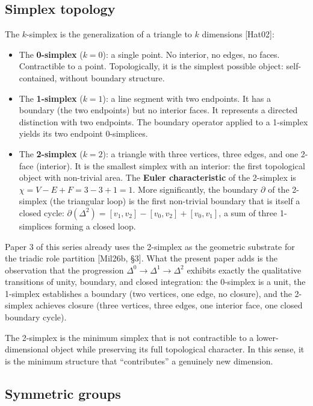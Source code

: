 \documentclass[12pt]{article}
\begin{document}
\subsection{Simplex topology}\label{simplex-topology}

The \(k\)-simplex is the generalization of a triangle to \(k\)
dimensions {[}Hat02{]}:

\begin{itemize}
\item
  The \textbf{0-simplex} (\(k=0\)): a single point. No interior, no
  edges, no faces. Contractible to a point. Topologically, it is the
  simplest possible object: self-contained, without boundary structure.
\item
  The \textbf{1-simplex} (\(k=1\)): a line segment with two endpoints.
  It has a boundary (the two endpoints) but no interior faces. It
  represents a directed distinction with two endpoints. The boundary
  operator applied to a 1-simplex yields its two endpoint 0-simplices.
\item
  The \textbf{2-simplex} (\(k=2\)): a triangle with three vertices,
  three edges, and one 2-face (interior). It is the smallest simplex
  with an interior: the first topological object with non-trivial area.
  The \textbf{Euler characteristic} of the 2-simplex is
  \(\chi = V - E + F = 3 - 3 + 1 = 1\). More significantly, the boundary
  \(\partial\) of the 2-simplex (the triangular loop) is the first
  non-trivial boundary that is itself a closed cycle:
  \(\partial(\Delta^2) = [v_1, v_2] - [v_0, v_2] + [v_0, v_1]\), a sum
  of three 1-simplices forming a closed loop.
\end{itemize}

Paper 3 of this series already uses the 2-simplex as the geometric
substrate for the triadic role partition {[}Mil26b, §3{]}. What the
present paper adds is the observation that the progression
\(\Delta^0 \to \Delta^1 \to \Delta^2\) exhibits exactly the qualitative
transitions of unity, boundary, and closed integration: the 0-simplex is
a unit, the 1-simplex establishes a boundary (two vertices, one edge, no
closure), and the 2-simplex achieves closure (three vertices, three
edges, one interior face, one closed boundary cycle).

The 2-simplex is the minimum simplex that is not contractible to a
lower-dimensional object while preserving its full topological
character. In this sense, it is the minimum structure that
``contributes'' a genuinely new dimension.

\subsection{Symmetric groups}\label{symmetric-groups}
\end{document}
